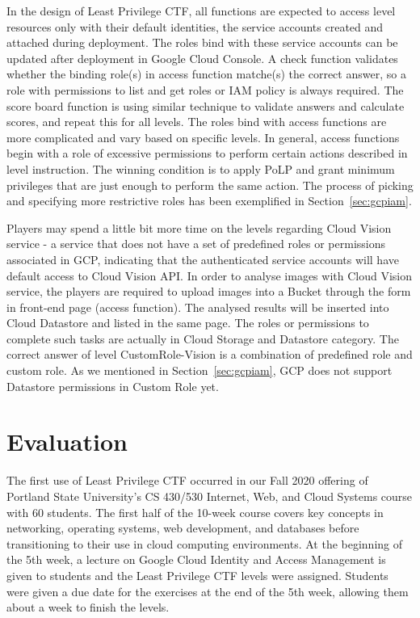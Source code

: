 \documentclass[a4paper,twoside]{article}
\begin{document}
In the design of Least Privilege CTF, all functions are expected to access level resources only with their default identities, the service accounts created and attached during deployment. The roles bind with these service accounts can be updated after deployment in Google Cloud Console. 
A check function validates whether the binding role(s) in access function matche(s) the correct answer, so a role with permissions to list and get roles or IAM policy is always required. The score board function is using similar technique to validate answers and calculate scores, and repeat this for all levels. The roles bind with access functions are more complicated and vary based on specific levels. In general, access functions begin with a role of excessive permissions to perform certain actions described in level instruction. The winning condition is to apply PoLP and grant minimum privileges that are just enough to perform the same action. The process of picking and specifying more restrictive roles has been exemplified in Section~\ref{sec:gcpiam}.

Players may spend a little bit more time on the levels regarding Cloud Vision service - a service that does not have a set of predefined roles or permissions associated in GCP, indicating that the authenticated service accounts will have default access to Cloud Vision API. In order to analyse images with Cloud Vision service, the players are required to upload images into a Bucket through the form in front-end page (access function). The analysed results will be inserted into Cloud Datastore and listed in the same page.  The roles or permissions to complete such tasks are actually in Cloud Storage and Datastore category. The correct answer of level CustomRole-Vision is a combination of predefined role and custom role. As we mentioned in Section~\ref{sec:gcpiam}, GCP does not support Datastore permissions in Custom Role yet.
 

\section{Evaluation}
 \noindent The first use of Least Privilege CTF occurred in our Fall 2020 offering of Portland State University's CS 430/530 Internet, Web, and Cloud Systems course with 60 students.  The first half of the 10-week course covers key concepts in networking, operating systems, web development, and databases before transitioning to their use in cloud computing environments. At the beginning of the 5th week, a lecture on Google Cloud Identity and Access Management is given to students and the Least Privilege CTF levels were assigned. Students were given a due date for the exercises at the end of the 5th week, allowing them about a week to finish the levels.
\end{document}
